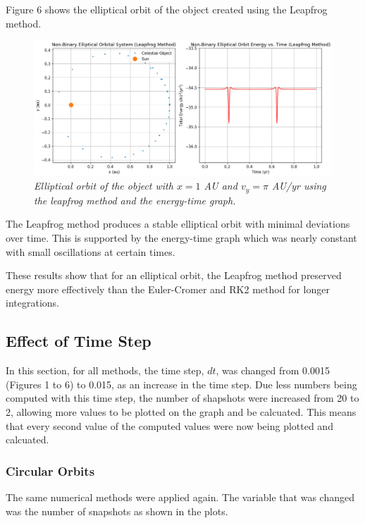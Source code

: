 \documentclass[11 pt, a4paper, twocolumn]{article}
\begin{document}
Figure 6 shows the elliptical orbit of the object created using the Leapfrog method.
\begin{figure}[H]
  \includegraphics[width=1\linewidth]{Leapfrog/leapfrogelliptic.png}
  \centering
  \caption{\textit{Elliptical orbit of the object with $x = 1$ AU and $v_y = \pi$ AU/yr using the
   leapfrog method and the energy-time graph.}} 
\end{figure}
\vspace{-1.5em}
The Leapfrog method produces a stable elliptical orbit with minimal deviations over time. 
This is supported by the energy-time graph which was nearly constant with small oscillations at certain
times.

These results show that for an elliptical orbit, the Leapfrog method preserved energy more effectively than
the Euler-Cromer and RK2 method for longer integrations.

\subsection{Effect of Time Step}
In this section, for all methods, the time step, $dt$, was changed from 0.0015 (Figures 1 to 6) to 0.015, as an increase in the time step. Due less numbers being computed with this time step, 
the number of shapshots were increased from 20 to 2, allowing more values to be plotted on the graph and be calcuated. This means that every second value of the computed values were now being plotted and calcuated.

\subsubsection{Circular Orbits}
The same numerical methods were applied again. The variable that was changed was the number of 
snapshots as shown in the plots.
\end{document}
